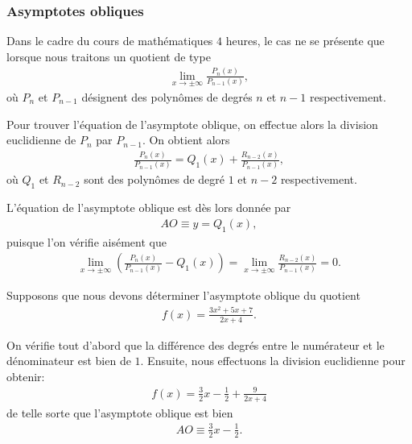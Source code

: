 \documentclass[main.tex]{subfiles}
\begin{document}
\subsubsection{Asymptotes obliques}

Dans le cadre du cours de mathématiques $4$ heures,
le cas ne se présente que lorsque nous traitons un quotient de type
\begin{align}
    \lim_{x \to \pm \infty} \frac {P_n(x)} {P_{n - 1}(x)},
\end{align}
où $P_n$ et $P_{n - 1}$ désignent des polynômes de degrés $n$ et $n - 1$ respectivement.

Pour trouver l'équation de l'asymptote oblique,
on effectue alors la division euclidienne de $P_n$ par $P_{n - 1}$.
On obtient alors
\begin{align}
    \frac {P_n(x)} {P_{n - 1}(x)} = Q_1(x) + \frac {R_{n - 2}(x)} {P_{n - 1}(x)},
\end{align}
où $Q_1$ et $R_{n - 2}$ sont des polynômes de degré $1$ et $n - 2$ respectivement.

L'équation de l'asymptote oblique est dès lors donnée par
\begin{align}
    AO \equiv y = Q_1(x),
\end{align}
puisque l'on vérifie aisément que
\begin{align}
    \lim_{x \to \pm \infty} \left(\frac {P_n(x)} {P_{n - 1}(x)} - Q_1(x)\right)
    = \lim_{x \to \pm \infty} \frac {R_{n - 2}(x)} {P_{n - 1}(x)} = 0.
\end{align}

\begin{example}

    Supposons que nous devons déterminer l'asymptote oblique du quotient
    \begin{align}
        f(x) = \frac {3x^2 + 5x + 7} {2 x + 4}.
    \end{align}

    On vérifie tout d'abord que la différence des degrés entre le numérateur et le dénominateur est bien de $1$.
    Ensuite,
    nous effectuons la division euclidienne pour obtenir:
    \begin{align}
        f(x) = \frac 3 2 x - \frac 1 2 + \frac 9 {2 x + 4}
    \end{align}
    de telle sorte que l'asymptote oblique est bien
    \begin{align}
        AO \equiv \frac 3 2 x - \frac 1 2.
    \end{align}
\end{example}
\end{document}
